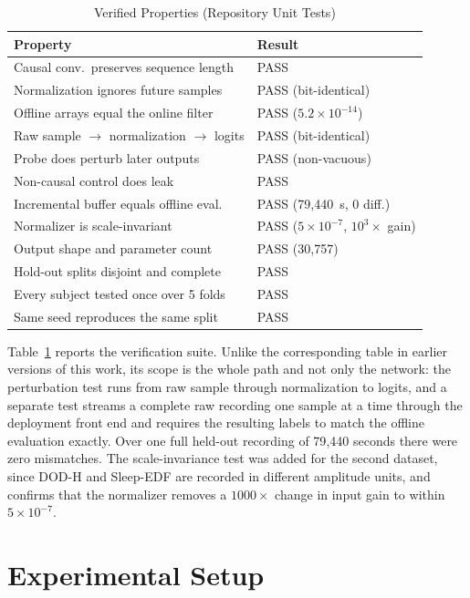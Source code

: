 \documentclass[conference]{IEEEtran}
\begin{document}
\begin{table}[t]
\caption{Verified Properties (Repository Unit Tests)}
\label{tab:verified}
\centering
\footnotesize
\begin{tabular}{@{}p{}l@{}}
\toprule
Property & Result \\
\midrule
Causal conv.\ preserves sequence length & PASS \\
Normalization ignores future samples & PASS (bit-identical) \\
Offline arrays equal the online filter & PASS ($5.2\times10^{-14}$) \\
Raw sample $\to$ normalization $\to$ logits & PASS (bit-identical) \\
Probe does perturb later outputs & PASS (non-vacuous) \\
Non-causal control does leak & PASS \\
Incremental buffer equals offline eval. & PASS (79{,}440~s, 0 diff.) \\
Normalizer is scale-invariant & PASS ($5\times10^{-7}$, $10^3\times$ gain) \\
Output shape and parameter count & PASS (30{,}757) \\
Hold-out splits disjoint and complete & PASS \\
Every subject tested once over 5 folds & PASS \\
Same seed reproduces the same split & PASS \\
\bottomrule
\end{tabular}
\end{table}

Table~\ref{tab:verified} reports the verification suite. Unlike the corresponding table in earlier
versions of this work, its scope is the whole path and not only the network: the perturbation test
runs from raw sample through normalization to logits, and a separate test streams a complete raw
recording one sample at a time through the deployment front end and requires the resulting labels
to match the offline evaluation exactly. Over one full held-out recording of 79{,}440 seconds there
were zero mismatches. The scale-invariance test was added for the second dataset, since DOD-H and
Sleep-EDF are recorded in different amplitude units, and confirms that the normalizer removes a
$1000\times$ change in input gain to within $5\times10^{-7}$.

\section{Experimental Setup}
\end{document}
